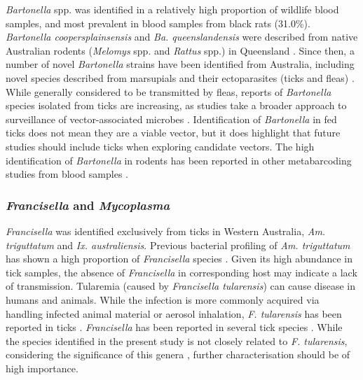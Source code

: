 \documentclass[a4paper, nobind]{templates/ociamthesis}
\begin{document}
\emph{Bartonella} spp. was identified in a relatively high proportion of wildlife blood samples, and most prevalent in blood samples from black rats (31.0\%).
\emph{Bartonella coopersplainsensis} and \emph{Ba. queenslandensis} were described from native Australian rodents (\emph{Melomys} spp. and \emph{Rattus} spp.) in Queensland \autocite{gundiBartonellaRattaustralianiSp2009}.
Since then, a number of novel \emph{Bartonella} strains have been identified from Australia, including novel species described from marsupials and their ectoparasites (ticks and fleas) \autocite{vilcinsBartonellalikeDNADetected2009,kaewmongkolCandidatusBartonellaAntechini2011,kaewmongkolGeneticCharacterizationFleaderived2011}.
While generally considered to be transmitted by fleas, reports of \emph{Bartonella} species isolated from ticks are increasing, as studies take a broader approach to surveillance of vector-associated microbes \autocite{rynkiewiczConcordanceBacterialCommunities2015,asyikhaDetectionBartonellaSp2020,krolEvaluatingTransmissionPaths2021}.
Identification of \emph{Bartonella} in fed ticks does not mean they are a viable vector, but it does highlight that future studies should include ticks when exploring candidate vectors.
The high identification of \emph{Bartonella} in rodents has been reported in other metabarcoding studies from blood samples \autocite{cohenSimilaritiesSeasonalVariations2015}.

\hypertarget{francisella-and-mycoplasma-1}{%
\subsubsection{\texorpdfstring{\emph{Francisella} and \emph{Mycoplasma}}{Francisella and Mycoplasma}}\label{francisella-and-mycoplasma-1}}

\emph{Francisella} was identified exclusively from ticks in Western Australia, \emph{Am. triguttatum} and \emph{Ix. australiensis}.
Previous bacterial profiling of \emph{Am. triguttatum} has shown a high proportion of \emph{Francisella} species \autocite{goftonBacterialProfilingReveals2015,eganBacterialCommunityProfiling2020}.
Given its high abundance in tick samples, the absence of \emph{Francisella} in corresponding host may indicate a lack of transmission.
Tularemia (caused by \emph{Francisella tularensis}) can cause disease in humans and animals.
While the infection is more commonly acquired via handling infected animal material or aerosol inhalation, \emph{F. tularensis} has been reported in ticks \autocite{regierCombinationMicrobiomeAnalysis2019}.
\emph{Francisella} has been reported in several tick species \autocite{garcia-vozmedianoDermacentorMarginatusDermacentor2020}.
While the species identified in the present study is not closely related to \emph{F. tularensis}, considering the significance of this genera \autocite{regierCombinationMicrobiomeAnalysis2019}, further characterisation should be of high importance.
\end{document}

